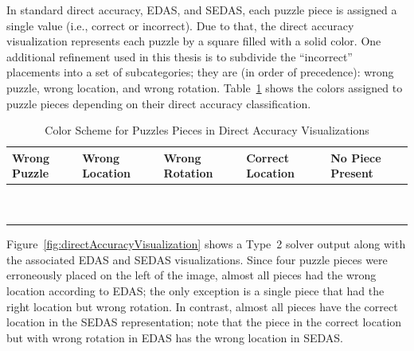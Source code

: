 \documentclass{report}
\begin{document}
In standard direct accuracy, EDAS, and SEDAS, each puzzle piece is assigned a single value (i.e., correct or incorrect).  Due to that, the direct accuracy visualization represents each puzzle by a square filled with a solid color.  One additional refinement used in this thesis is to subdivide the ``incorrect'' placements into a set of subcategories; they are (in order of precedence): wrong puzzle, wrong location, and wrong rotation.  Table~\ref{tab:directAccuracyColors} shows the colors assigned to puzzle pieces depending on their direct accuracy classification.

\begin{table}[h]
	\begin{center}
  		\begin{tabular}{ | >{\centering\arraybackslash}m{0.6in} | >{\centering\arraybackslash}m{0.6in} | >{\centering\arraybackslash}m{0.6in} | >{\centering\arraybackslash}m{0.6in} | >{\centering\arraybackslash}m{0.6in} | }
 \hline
    		Wrong Puzzle & Wrong Location & Wrong Rotation & Correct Location  & No Piece Present  \\ \hline
			{\cellcolor{blue}~} & {\cellcolor{red}~}  & {\cellcolor{orange}~}  & {\cellcolor{green}~} & {\cellcolor{black}~}  \\
			{\cellcolor{blue}~} & {\cellcolor{red}~}  & {\cellcolor{orange}~}  & {\cellcolor{green}~} & {\cellcolor{black}~} \\
 \hline
		\end{tabular}
	\end{center}
\caption{Color Scheme for Puzzles Pieces in Direct Accuracy Visualizations}\label{tab:directAccuracyColors}
\end{table}

Figure~\ref{fig:directAccuracyVisualization} shows a Type~2 solver output along with the associated EDAS and SEDAS visualizations. Since four puzzle pieces were erroneously placed on the left of the image, almost all pieces had the wrong location according to EDAS; the only exception is a single piece that had the right location but wrong rotation.  In contrast, almost all pieces have the correct location in the SEDAS representation; note that the piece in the correct location but with wrong rotation in EDAS has the wrong location in SEDAS.
\end{document}
